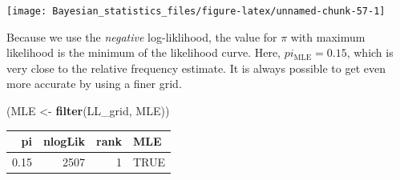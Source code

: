 \documentclass[]{svmono}
\newenvironment{Shaded}{\begin{snugshade}}{\end{snugshade}}
\newcommand{\KeywordTok}[1]{\textcolor[rgb]{0.13,0.29,0.53}{\textbf{#1}}}
\newcommand{\DataTypeTok}[1]{\textcolor[rgb]{0.13,0.29,0.53}{#1}}
\newcommand{\DecValTok}[1]{\textcolor[rgb]{0.00,0.00,0.81}{#1}}
\newcommand{\StringTok}[1]{\textcolor[rgb]{0.31,0.60,0.02}{#1}}
\newcommand{\OperatorTok}[1]{\textcolor[rgb]{0.81,0.36,0.00}{\textbf{#1}}}
\newcommand{\NormalTok}[1]{#1}
\begin{document}
\begin{Shaded}
\end{Shaded}

\texttt{[image: Bayesian\_statistics\_files/figure-latex/unnamed-chunk-57-1]}

Because we use the \emph{negative} log-liklihood, the value for \(\pi\)
with maximum likelihood is the minimum of the likelihood curve. Here,
\(pi_\text{MLE} = 0.15\), which is very close to the relative frequency
estimate. It is always possible to get even more accurate by using a
finer grid.

\begin{Shaded}
\begin{Highlighting}[]
\NormalTok{(MLE <-}\StringTok{ }\KeywordTok{filter}\NormalTok{(LL_grid, MLE))}
\end{Highlighting}
\end{Shaded}

\begin{tabular}{r|r|r|l}
\hline
pi & nlogLik & rank & MLE\\
\hline
0.15 & 2507 & 1 & TRUE\\
\hline
\end{tabular}
\end{document}
